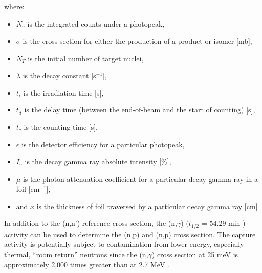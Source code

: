 \documentclass[5p]{elsarticle}
\newcommand{\comment}[1]{\todo[color=blue!20!white,inline]{ASV: #1}}
\begin{document}
where:

\begin{itemize}
  

\item $N_{\gamma}$ is the integrated counts under a photopeak,


\item $\sigma$ is the cross section for either the production of a product or isomer [mb],

\item $N_T$ is the initial number of target nuclei,

\item $\lambda$  is the decay constant [s$^{-1}$],

\item $t_i$ is the irradiation time [s],

\item $t_d$ is the delay time (between the end-of-beam and the start of counting) [s],

\item $t_c$ is the counting time   [s],

\item $\epsilon$ is the  detector efficiency for a particular photopeak,

\item $I_\gamma$ is the decay gamma ray absolute intensity [\%],

\item $\mu$ is the photon attenuation coefficient for a particular decay gamma ray in a foil [cm$^{-1}$],

\item and $x$ is the thickness of foil traversed by a particular decay gamma ray [cm] 
\end{itemize}

In addition to the (n,n') reference cross section, the (n,$\gamma$)  ($t_{1/2}$ = 54.29 min \cite{Blachot2010}) activity can be used to determine the  (n,p) and (n,p) cross section.
 The capture activity is potentially subject to contamination from lower energy, especially thermal, \enquote{room return} neutrons since the (n,$\gamma$) cross section at 25 meV is approximately 2,000 times greater than at 2.7 MeV  \cite{Capote2012,zsolnay2012technical}.
   

\end{document}
